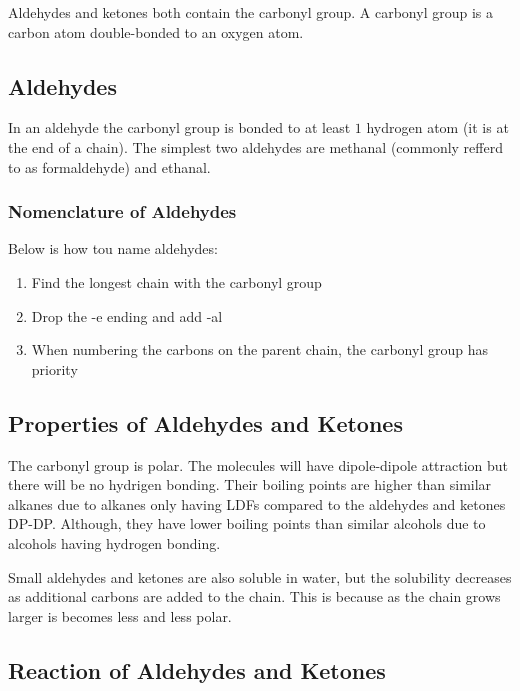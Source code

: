 \documentclass[12pt, a4paper]{article}
\begin{document}
    Aldehydes and ketones both contain the carbonyl group. A carbonyl 
    group is a carbon atom double-bonded to an oxygen atom.

    \subsection{Aldehydes}

    In an aldehyde the carbonyl group is bonded to at least $1$ hydrogen atom (it is 
    at the end of a  chain). The simplest two aldehydes are methanal (commonly refferd to 
    as formaldehyde) and ethanal. 

    \subsubsection{Nomenclature of Aldehydes}

    Below is how tou name aldehydes:

    \begin{enumerate}
        \item Find the longest chain with the carbonyl group
        \item Drop the -e ending and add -al
        \item When numbering the carbons on the parent chain, the 
              carbonyl group has priority
    \end{enumerate}

    \subsection{Properties of Aldehydes and Ketones}

    The carbonyl group is polar. The molecules will have dipole-dipole attraction but there will be no 
    hydrigen bonding. Their boiling points are higher than similar alkanes due to alkanes only having LDFs
    compared to the aldehydes and ketones DP-DP. Although, they have lower boiling points than similar 
    alcohols due to alcohols having hydrogen bonding. 
    
    Small aldehydes and ketones are also soluble in water,  but the solubility decreases as additional carbons 
    are added to the chain. This is because as the chain grows larger is becomes less and less polar. 

    \subsection{Reaction of Aldehydes and Ketones}
\end{document}
